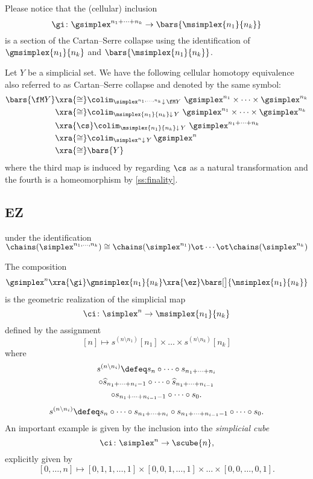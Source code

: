 \begin{remark*}
	Please notice that the (cellular) inclusion
	\[
	\gi \colon \gsimplex^{n_1+\dots+n_k} \to
	\bars{\msimplex{n_1}{n_k}}
	\]
	is a section of the Cartan--Serre collapse using the identification of $\gmsimplex{n_1}{n_k}$ and $\bars{\msimplex{n_1}{n_k}}$.
\end{remark*}

Let $Y$ be a simplicial set.
We have the following cellular homotopy equivalence also referred to as Cartan--Serre collapse and denoted by the same symbol:
\[
\begin{split}
\bars{\fM Y} & \xra{\cong}
\colim_{\simplex^{n_1,\dots,n_k} \downarrow \, \fM Y} \
\gsimplex^{n_1} \times\dots\times \gsimplex^{n_k} \\ & \xra{\cong}
\colim_{\msimplex{n_1}{n_k} \downarrow \, Y} \
\gsimplex^{n_1} \times\dots\times \gsimplex^{n_k} \\ & \xra{\cs}
\colim_{\msimplex{n_1}{n_k} \downarrow \, Y} \
\gsimplex^{n_1+\dots+n_k} \\ & \xra{\cong}
\colim_{\simplex^{n} \downarrow \, Y} \,
\gsimplex^{n} \\ & \xra{\cong}
\bars{Y}
\end{split}
\]
where the third map is induced by regarding $\cs$ as a natural transformation and the fourth is a homeomorphism by \cref{ss:finality}.


\subsection{EZ}

under the identification $\chains(\simplex^{n_1,\dots,n_k}) \cong \chains(\simplex^{n_1}) \ot \dotsb \ot \chains(\simplex^{n_k})$

The composition
\[
\gsimplex^n \xra{\gi}
\gmsimplex{n_1}{n_k} \xra{\ez}
\bars[\big]{\msimplex{n_1}{n_k}}
\]
is the geometric realization of the simplicial map
\[
\ci \colon \simplex^n \to \msimplex{n_1}{n_k}
\]
defined by the assignment
\[
[n] \mapsto s^{(n \setminus n_1)} [n_1] \times\dots\times s^{(n \setminus n_k)} [n_k]
\]
where
\begin{multline*}
	s^{(n \setminus n_i)} \defeq
	s_{n} \circ\dotsm\circ s_{n_1+\dots+n_i} \\
	\circ \widehat{s}_{n_1+\dots+n_i-1} \circ\dotsm\circ \widehat{s}_{n_1+\dots+n_{i-1}} \\ \circ
	s_{n_1+\dots+n_{i-1}-1}  \circ\dotsm\circ s_0.
\end{multline*}
\begin{equation*}
	s^{(n \setminus n_i)} \defeq
	s_{n} \circ\dotsm\circ s_{n_1+\dots+n_i} \circ s_{n_1+\dots+n_{i-1}-1}  \circ\dotsm\circ s_0.
\end{equation*}
An important example is given by the inclusion into the \textit{simplicial cube}
\[
\ci \colon \simplex^n \to \scube{n},
\]
explicitly given by
\[
[0,\dots,n] \mapsto
[0,1,1,\dots,1] \times [0,0,1,\dots,1] \times\dots\times [0,0,\dots,0,1].
\]